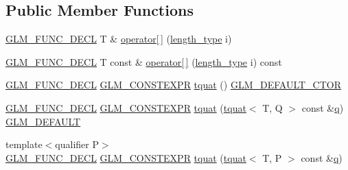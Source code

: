 \subsection*{Public Member Functions}
\begin{DoxyCompactItemize}
\item 
\mbox{\hyperlink{setup_8hpp_ab2d052de21a70539923e9bcbf6e83a51}{G\+L\+M\+\_\+\+F\+U\+N\+C\+\_\+\+D\+E\+CL}} T \& \mbox{\hyperlink{structglm_1_1tquat_a0676fa7abe008f2912d296f6b3a569cf}{operator\mbox{[}$\,$\mbox{]}}} (\mbox{\hyperlink{structglm_1_1tquat_a6d9ab28781d7835b30216a996484c026}{length\+\_\+type}} i)
\item 
\mbox{\hyperlink{setup_8hpp_ab2d052de21a70539923e9bcbf6e83a51}{G\+L\+M\+\_\+\+F\+U\+N\+C\+\_\+\+D\+E\+CL}} T const  \& \mbox{\hyperlink{structglm_1_1tquat_a88fc5911dc554c71f5933d2fb99a7a7a}{operator\mbox{[}$\,$\mbox{]}}} (\mbox{\hyperlink{structglm_1_1tquat_a6d9ab28781d7835b30216a996484c026}{length\+\_\+type}} i) const
\item 
\mbox{\hyperlink{setup_8hpp_ab2d052de21a70539923e9bcbf6e83a51}{G\+L\+M\+\_\+\+F\+U\+N\+C\+\_\+\+D\+E\+CL}} \mbox{\hyperlink{setup_8hpp_a08b807947b47031d3a511f03f89645ad}{G\+L\+M\+\_\+\+C\+O\+N\+S\+T\+E\+X\+PR}} \mbox{\hyperlink{structglm_1_1tquat_a5ddc2ac5c094aa455d5dc896a1acf686}{tquat}} () \mbox{\hyperlink{setup_8hpp_afb97a4e995bc004c0cbbfa22125b80ba}{G\+L\+M\+\_\+\+D\+E\+F\+A\+U\+L\+T\+\_\+\+C\+T\+OR}}
\item 
\mbox{\hyperlink{setup_8hpp_ab2d052de21a70539923e9bcbf6e83a51}{G\+L\+M\+\_\+\+F\+U\+N\+C\+\_\+\+D\+E\+CL}} \mbox{\hyperlink{setup_8hpp_a08b807947b47031d3a511f03f89645ad}{G\+L\+M\+\_\+\+C\+O\+N\+S\+T\+E\+X\+PR}} \mbox{\hyperlink{structglm_1_1tquat_a2711d3970e6aeeade71debf8a9b5c012}{tquat}} (\mbox{\hyperlink{structglm_1_1tquat}{tquat}}$<$ T, Q $>$ const \&\mbox{\hyperlink{_s_d_l__opengl_8h_a8fc1e7b9baaae687804c7eed46ca09c6}{q}}) \mbox{\hyperlink{setup_8hpp_aefce7051c376a64ba89fa93a9f63bc2c}{G\+L\+M\+\_\+\+D\+E\+F\+A\+U\+LT}}
\item 
{\footnotesize template$<$qualifier P$>$ }\\\mbox{\hyperlink{setup_8hpp_ab2d052de21a70539923e9bcbf6e83a51}{G\+L\+M\+\_\+\+F\+U\+N\+C\+\_\+\+D\+E\+CL}} \mbox{\hyperlink{setup_8hpp_a08b807947b47031d3a511f03f89645ad}{G\+L\+M\+\_\+\+C\+O\+N\+S\+T\+E\+X\+PR}} \mbox{\hyperlink{structglm_1_1tquat_ac6d649e6c91a6bdcf324f870010a81bb}{tquat}} (\mbox{\hyperlink{structglm_1_1tquat}{tquat}}$<$ T, P $>$ const \&\mbox{\hyperlink{_s_d_l__opengl_8h_a8fc1e7b9baaae687804c7eed46ca09c6}{q}})
\item 

\end{DoxyCompactItemize}
